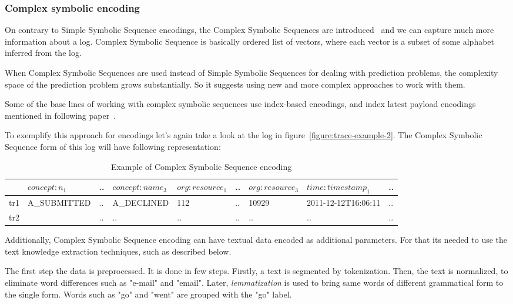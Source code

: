\subsubsection{Complex symbolic encoding} \label{complex-sym-enc}

On contrary to Simple Symbolic Sequence encodings, the Complex Symbolic Sequences are introduced~\cite{Leontjeva2015} and we can capture much more information about a log. Complex Symbolic Sequence is basically ordered list of vectors, where each vector is a subset of some alphabet inferred from the log.

When Complex Symbolic Sequences are used instead of Simple Symbolic Sequences for dealing with prediction problems, the complexity space of the prediction problem grows substantially. So it suggests using new and more complex approaches to work with them.

Some of the base lines of working with complex symbolic sequences use index-based encodings, and index latest payload encodings mentioned in following paper~\cite{Leontjeva2015}.   

To exemplify this approach for encodings let's again take a look at the log in figure~\ref{figure:trace-example-2}. The Complex Symbolic Sequence form of this log will have following representation:

\begin{table}[h]
	\centering
	\begin{tabular}{| l | l | l | l | l | l | l | l | l |}
		\hline
		& $concept:n_{1}$ & .. & $concept:name_{3}$ & $org:resource_{1}$ & .. & $org:resource_{3}$ & $time:timestamp_{1}$ & .. \\	
		\hline
		tr1 & A\_SUBMITTED & .. & A\_DECLINED &  112 & .. & 10929 &  2011-12-12T16:06:11 & ..  \\
		tr2 &  & .. & .. & .. & .. & ..  & .. & ..  \\
		\hline
	\end{tabular}
	\caption{Example of Complex Symbolic Sequence encoding}
	\label{tab:complesymbseq_log_example}
\end{table}


Additionally, Complex Symbolic Sequence encoding can have textual data encoded as additional parameters. For that its needed to use the text knowledge extraction techniques, such as described below.

The first step the data is preprocessed. It is done in few steps. Firstly, a text is segmented by tokenization. Then, the text is normalized, to eliminate word differences such as "e-mail" and "email". Later, \textit{lemmatization} is used to bring same words of different grammatical form to the single form. Words such as "go" and "went" are grouped with the "go" label.

